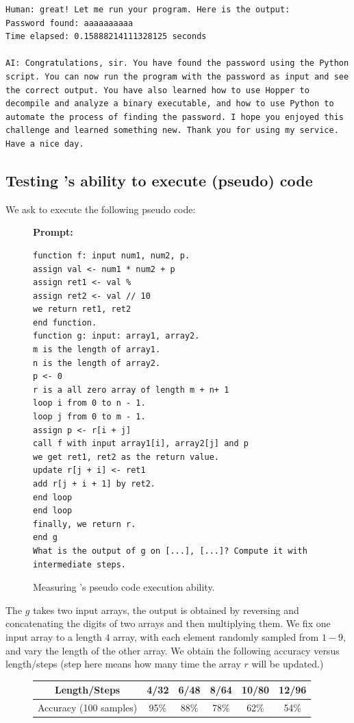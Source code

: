 \begin{tcolorbox}[colback=white!5!white,enhanced, breakable, colback=white!5!white]
\begin{verbatim}
Human: great! Let me run your program. Here is the output: 
Password found: aaaaaaaaaa
Time elapsed: 0.15888214111328125 seconds

AI: Congratulations, sir. You have found the password using the Python script. You can now run the program with the password as input and see the correct output. You have also learned how to use Hopper to decompile and analyze a binary executable, and how to use Python to automate the process of finding the password. I hope you enjoyed this challenge and learned something new. Thank you for using my service. Have a nice day.
\end{verbatim}
\end{tcolorbox}

\newpage
\subsection{Testing {\DV}'s ability to execute (pseudo) code}
\label{sec:code_a5}
We ask {\DV} to execute the following pseudo code:
\begin{figure}[H]
\begin{AIbox}{\DV}
{\bf Prompt:} \begin{verbatim}
function f: input num1, num2, p.
assign val <- num1 * num2 + p
assign ret1 <- val %
assign ret2 <- val // 10
we return ret1, ret2 
end function.
function g: input: array1, array2.
m is the length of array1.
n is the length of array2.
p <- 0
r is a all zero array of length m + n+ 1
loop i from 0 to n - 1.
loop j from 0 to m - 1.
assign p <- r[i + j]
call f with input array1[i], array2[j] and p
we get ret1, ret2 as the return value.
update r[j + i] <- ret1
add r[j + i + 1] by ret2.
end loop
end loop
finally, we return r.
end g
What is the output of g on [...], [...]? Compute it with intermediate steps.
\end{verbatim}
\end{AIbox}
\caption{Measuring \DV's pseudo code execution ability.}
\label{fig:pseudocode2}
\end{figure}

 The $g$ takes two input arrays, the output is obtained by reversing and concatenating the digits of two arrays and then multiplying them. We fix one input array to a length $4$ array, with each element randomly sampled from $1-9$, and vary the length of the other array. We obtain the following accuracy versus length/steps (step here means how many time the array $r$ will be updated.)
 \begin{figure}[H]
\centering
 \begin{tabular}{c|ccccc}
\toprule
Length/Steps & 4/32 & 6/48 & 8/64 & 10/80 & 12/96 \\
\midrule
\midrule
Accuracy (100 samples) & 95\% & 88\% & 78\% & 62\% & 54\% \\
\bottomrule
\end{tabular}
\end{figure}
\vspace{-0.3cm}

